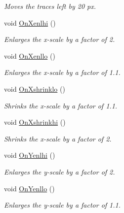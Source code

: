\begin{DoxyCompactItemize}
\begin{DoxyCompactList}\small\item\em Moves the traces left by 20 px. \item\end{DoxyCompactList}\item 
void \hyperlink{classwxStfGraph_a9dcef0216b9c7eef5db0cf4319c2bd5b}{OnXenlhi} ()
\begin{DoxyCompactList}\small\item\em Enlarges the x-\/scale by a factor of 2. \item\end{DoxyCompactList}\item 
void \hyperlink{classwxStfGraph_a89d5fba83bfd0065f67a0a1ac0c65b09}{OnXenllo} ()
\begin{DoxyCompactList}\small\item\em Enlarges the x-\/scale by a factor of 1.1. \item\end{DoxyCompactList}\item 
void \hyperlink{classwxStfGraph_aa7465a5d3f1304e240a4375eb352ad68}{OnXshrinklo} ()
\begin{DoxyCompactList}\small\item\em Shrinks the x-\/scale by a factor of 1.1. \item\end{DoxyCompactList}\item 
void \hyperlink{classwxStfGraph_a0dc27892670291a85e9b1dd9990be69a}{OnXshrinkhi} ()
\begin{DoxyCompactList}\small\item\em Shrinks the x-\/scale by a factor of 2. \item\end{DoxyCompactList}\item 
void \hyperlink{classwxStfGraph_a10681aa17f96022712906eed32b0b510}{OnYenlhi} ()
\begin{DoxyCompactList}\small\item\em Enlarges the y-\/scale by a factor of 2. \item\end{DoxyCompactList}\item 
void \hyperlink{classwxStfGraph_a1eff713a08c34e8a0b3d80ae9ec99454}{OnYenllo} ()
\begin{DoxyCompactList}\small\item\em Enlarges the y-\/scale by a factor of 1.1. \item\end{DoxyCompactList}\item 

\end{DoxyCompactItemize}
